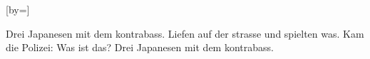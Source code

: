  

[by=]




\beginverse
Drei Japanesen mit dem kontrabass.
Liefen auf der strasse und spielten was.
Kam die Polizei: Was ist das?
Drei Japanesen mit dem kontrabass.
\endverse





\endsong
